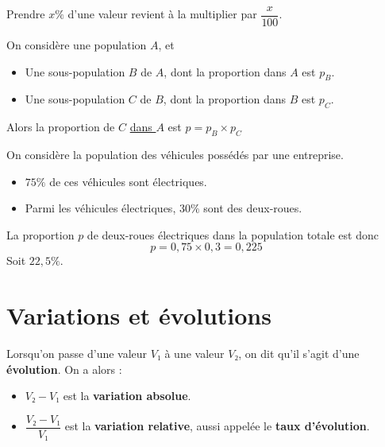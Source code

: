 \documentclass[
	classe=$2^{de}$
]{coursclass}
\begin{document}
\begin{remarque}
	Prendre $x\%$ d'une valeur revient à la multiplier par $\dfrac{x}{100}$.
\end{remarque}

\begin{propriete}
	\begin{center}
	\end{center}

	On considère une population $A$, et
	\begin{itemize}
		\item Une sous-population $B$ de $A$, dont la proportion dans $A$ est $p_B$.
		\item Une sous-population $C$ de $B$, dont la proportion dans $B$ est $p_C$.
	\end{itemize}

	Alors la proportion de $C$ \uline{dans $A$} est $p = p_B × p_C$
\end{propriete}

\begin{exemple}
	On considère la population des véhicules possédés par une entreprise.

	\begin{itemize}
		\item $75\%$ de ces véhicules sont électriques.
		\item Parmi les véhicules électriques, $30\%$ sont des deux-roues.
	\end{itemize}
	La proportion $p$ de deux-roues électriques dans la population totale est donc
	$$ p = 0,75 × 0,3 = 0,225 $$
	Soit $22,5\%$.
\end{exemple}

\section{Variations et évolutions}

\begin{definition}[Variations]
	Lorsqu'on passe d'une valeur $V₁$ à une valeur $V₂$, on dit qu'il s'agit d'une \textbf{évolution}. On a alors :
	\begin{itemize}
		\item $V₂ - V₁$ est la \textbf{variation absolue}.
		\item $\dfrac{V₂ - V₁}{V₁}$ est la \textbf{variation relative}, aussi appelée le \textbf{taux d'évolution}.
	\end{itemize}
\end{definition}
\end{document}
